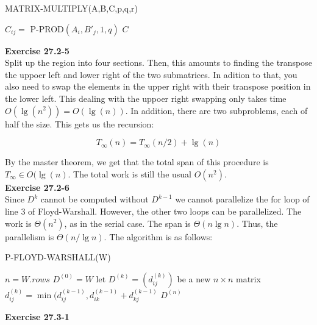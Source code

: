 \documentclass{article}
\begin{document}
\begin{algorithm}
\caption{MATRIX-MULTIPLY(A,B,C,p,q,r)}
\begin{algorithmic}[1]
		\State $C_{ij} = $ P-PROD$(A_i, B'_j, 1,q)$
	\EndParFor
\EndParFor
\State \Return $C$
\end{algorithmic}
\end{algorithm}


\noindent\textbf{Exercise 27.2-5}\\

Split up the region into four sections. Then, this amounts to finding the transpose the uppoer left and lower right of the two submatrices. In adition to that, you also need to swap the elements in the upper right with their transpose position in the lower left. This dealing with the uppoer right swapping only takes time $O(\lg(n^2)) = O(\lg(n))$. In addition, there are two subproblems, each of half the size. This gets us the recursion:

\[
T_{\infty}(n) = T_{\infty}(n/2) + \lg(n)
\]

By the master theorem, we get that the total span of this procedure is $T_{\infty} \in O(\lg(n)$. The total work is still the usual $O(n^2)$.\\

\noindent\textbf{Exercise 27.2-6}\\

Since $D^k$ cannot be computed without $D^{k-1}$ we cannot parallelize the for loop of line 3 of Floyd-Warshall.  However, the other two loops can be parallelized.  The work is $\Theta(n^2)$, as in the serial case.  The span is $\Theta(n \lg n)$.  Thus, the parallelism is $\Theta(n/\lg n)$.  The algorithm is as follows:\\

\begin{algorithm}
\caption{P-FLOYD-WARSHALL(W)}
\begin{algorithmic}[1]
\State $n = W.rows$
\State $D^{(0)} = W$
	\State let $D^{(k)} = (d_{ij}^{(k)})$ be a new $n \times n$ matrix
			\State $d_{ij}^{(k)} = \min (d_{ij}^{(k-1)},d_{ik}^{(k-1)} + d_{kj}^{(k-1)} $
		\EndParFor
	\EndParFor
\EndFor
\State \Return $D^{(n)}$
\end{algorithmic}
\end{algorithm}


\noindent\textbf{Exercise 27.3-1}\\
\end{document}
